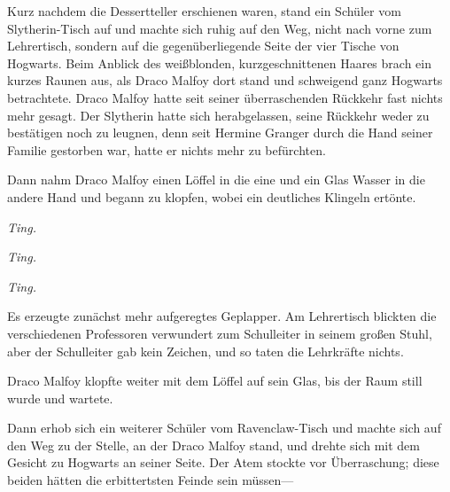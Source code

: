 Kurz nachdem die Dessertteller erschienen waren, stand ein Schüler vom Slytherin-Tisch auf und machte sich ruhig auf den Weg, nicht nach vorne zum Lehrertisch, sondern auf die gegenüberliegende Seite der vier Tische von Hogwarts. Beim Anblick des weißblonden, kurzgeschnittenen Haares brach ein kurzes Raunen aus, als Draco Malfoy dort stand und schweigend ganz Hogwarts betrachtete. Draco Malfoy hatte seit seiner überraschenden Rückkehr fast nichts mehr gesagt. Der Slytherin hatte sich herabgelassen, seine Rückkehr weder zu bestätigen noch zu leugnen, denn seit Hermine Granger durch die Hand seiner Familie gestorben war, hatte er nichts mehr zu befürchten.

Dann nahm Draco Malfoy einen Löffel in die eine und ein Glas Wasser in die andere Hand und begann zu klopfen, wobei ein deutliches Klingeln ertönte.

\emph{Ting.}

\emph{Ting.}

\emph{Ting.}

Es erzeugte zunächst mehr aufgeregtes Geplapper. Am Lehrertisch blickten die verschiedenen Professoren verwundert zum Schulleiter in seinem großen Stuhl, aber der Schulleiter gab kein Zeichen, und so taten die Lehrkräfte nichts.

Draco Malfoy klopfte weiter mit dem Löffel auf sein Glas, bis der Raum still wurde und wartete.

Dann erhob sich ein weiterer Schüler vom Ravenclaw-Tisch und machte sich auf den Weg zu der Stelle, an der Draco Malfoy stand, und drehte sich mit dem Gesicht zu Hogwarts an seiner Seite. Der Atem stockte vor Überraschung; diese beiden hätten die erbittertsten Feinde sein müssen—


